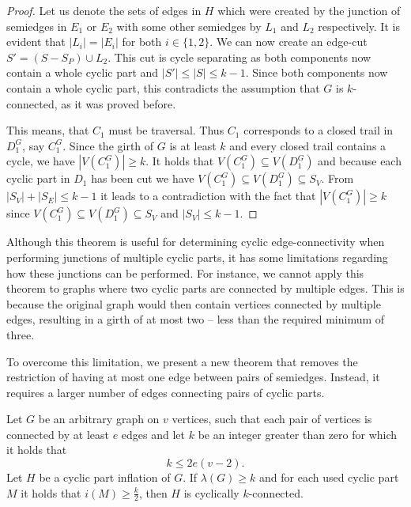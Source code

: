 \documentclass[12pt, twoside]{book}
\begin{document}
\begin{proof}
	Let us denote the sets of edges in $H$ which were created by the junction of semiedges in $E_1$ or $E_2$ with some other semiedges by $L_1$ and $L_2$ respectively. It is evident that $|L_i|=|E_i|$ for both $i\in\{1,2\}$. We can now create an edge-cut $S'=(S-S_P)\cup L_2$. This cut is cycle separating as both components now contain a whole cyclic part and $|S'|\leq |S|\leq k-1$. Since both components now contain a whole cyclic part, this contradicts the assumption that $G$ is $k$-connected, as it was proved before.
	
	This means, that $C_1$ must be traversal. Thus $C_1$ corresponds to a closed trail in $D_1^G$, say $C_1^G$. Since the girth of $G$ is at least $k$ and every closed trail contains a cycle, we have $|V(C_1^G)|\geq k$. It holds that $V(C_1^G)\subseteq V(D_1^G)$ and because each cyclic part in $D_1$ has been cut we have $V(C_1^G)\subseteq V(D_1^G)\subseteq S_V$. From $|S_V|+|S_E|\leq k-1$ it leads to a contradiction with the fact that $|V(C_1^G)|\geq k$ since $V(C_1^G)\subseteq V(D_1^G)\subseteq S_V$ and $|S_V|\leq k-1$.
\end{proof}

Although this theorem is useful for determining cyclic edge-connectivity when performing junctions of multiple cyclic parts, it has some limitations regarding how these junctions can be performed. For instance, we cannot apply this theorem to graphs where two cyclic parts are connected by multiple edges. This is because the original graph would then contain vertices connected by multiple edges, resulting in a girth of at most two -- less than the required minimum of three.

To overcome this limitation, we present a new theorem that removes the restriction of having at most one edge between pairs of semiedges. Instead, it requires a larger number of edges connecting pairs of cyclic parts.

\begin{theorem}\label{th:cyclic-part-inflation-kve}
	Let $G$ be an arbitrary graph on $v$ vertices, such that each pair of vertices is connected by at least $e$ edges and let $k$ be an integer greater than zero for which it holds that
	$$k\leq 2e(v-2).$$
	Let $H$ be a cyclic part inflation of $G$. If $\lambda(G)\geq k$ and for each used cyclic part $M$ it holds that $i(M)\geq \frac{k}{2}$, then $H$ is cyclically $k$-connected.
\end{theorem}
\end{document}
